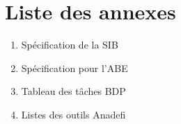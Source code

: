 \section*{Liste des annexes}
\begin{enumerate}
  \item \Large{Spécification de la SIB}
  \item \Large{Spécification pour l'ABE}
  \item \Large{Tableau des tâches BDP}
  \item \Large{Listes des outils Anadefi}
\end{enumerate}